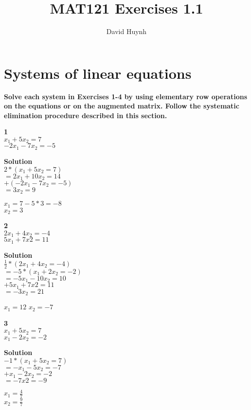\documentclass{article}
\begin{document}
\title{MAT121 Exercises 1.1}
\author{David Huynh}
\date{}

\maketitle

\section{Systems of linear equations}

\textbf{Solve each system in Exercises 1-4 by using elementary row operations on the equations or on the augmented matrix. Follow the systematic elimination procedure described in this section.}

\textbf{1}\\
$x_{1} + 5x_{2} = 7$\\
$-2x_{1} - 7x_{2} = -5$

\textbf{Solution}\\
$2*(x_{1} + 5x_{2} = 7)$\\
$= 2x_{1} + 10x_{2} = 14$\\
$+(-2x_{1} - 7x_{2} = -5)$\\
$= 3x_{2} = 9$

$x_{1} = 7 - 5 * 3 = -8$\\
$x_{2}  = 3$

\textbf{2}\\
$2x_{1} + 4x_{2} = -4$\\
$5x_{1} + 7x{2} = 11$

\textbf{Solution}\\
$\frac{1}{2}*(2x_{1} + 4x_{2} = -4)$\\
$=-5*(x_{1} + 2x_{2} = -2)$\\
$=-5x_{1} - 10x_{2} = 10$\\
$+5x_{1} + 7x{2} = 11$\\
$= -3x_{2} = 21$

$x_{1} = 12$
$x_{2} = -7$

\textbf{3}\\
$x_{1} + 5x_{2} = 7$\\
$x_{1} - 2x_{2} = -2$

\textbf{Solution}\\
$-1*(x_{1} + 5x_{2} = 7)$\\
$=-x_{1} - 5x_{2} = -7$\\
$+x_{1} -2x_{2} = -2$\\
$= -7x{2} = -9$

$x_{1} = \frac{4}{7}$\\
$x_{2} = \frac{9}{7}$
\end{document}
